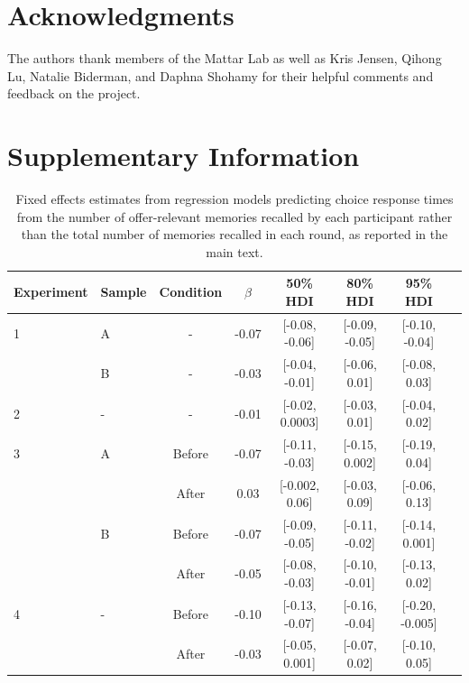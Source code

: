 \documentclass[10pt,letterpaper]{article}
\begin{document}
\section{Acknowledgments}
The authors thank members of the Mattar Lab as well as Kris Jensen, Qihong Lu, Natalie Biderman, and Daphna Shohamy for their helpful comments and feedback on the project.


\onecolumn  %
\setcounter{figure}{0}
\setcounter{table}{0}
\renewcommand{\thefigure}{S\arabic{figure}}
\renewcommand{\thetable}{S\arabic{table}}

\section{Supplementary Information}

\begin{table}[h!]
\centering
\begin{tabular}{llcccccc}
\hline
Experiment & Sample & Condition & $\beta$ & 50\% HDI & 80\% HDI & 95\% HDI \\
\hline
1 & A & - & -0.07 & [-0.08, -0.06] & [-0.09, -0.05] & [-0.10, -0.04] \\
  & B & - & -0.03 & [-0.04, -0.01] & [-0.06, 0.01] & [-0.08, 0.03] \\
2 & - & - & -0.01 & [-0.02, 0.0003] & [-0.03, 0.01] & [-0.04, 0.02] \\
\hline
3 & A & Before & -0.07 & [-0.11, -0.03] & [-0.15, 0.002] & [-0.19, 0.04] \\
  &   & After & 0.03 & [-0.002, 0.06] & [-0.03, 0.09] & [-0.06, 0.13] \\
  & B & Before & -0.07 & [-0.09, -0.05] & [-0.11, -0.02] & [-0.14, 0.001] \\
  &   & After & -0.05 & [-0.08, -0.03] & [-0.10, -0.01] & [-0.13, 0.02] \\
4 & - & Before & -0.10 & [-0.13, -0.07] & [-0.16, -0.04] & [-0.20, -0.005] \\
  &   & After & -0.03 & [-0.05, 0.001] & [-0.07, 0.02] & [-0.10, 0.05] \\
\hline
\end{tabular}
\caption{Fixed effects estimates from regression models predicting choice response times from the number of offer-relevant memories recalled by each participant rather than the total number of memories recalled in each round, as reported in the main text.}
\label{tab:suppRT}
\end{table}
\end{document}
